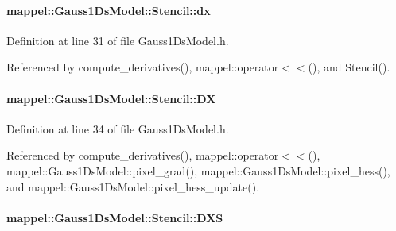 \paragraph[{\texorpdfstring{dx}{dx}}]{ mappel\+::\+Gauss1\+Ds\+Model\+::\+Stencil\+::dx}\hypertarget{classmappel_1_1Gauss1DsModel_1_1Stencil_a89a81cafd54335711f4ae04c0bd8fb26}{}\label{classmappel_1_1Gauss1DsModel_1_1Stencil_a89a81cafd54335711f4ae04c0bd8fb26}


Definition at line 31 of file Gauss1\+Ds\+Model.\+h.



Referenced by compute\+\_\+derivatives(), mappel\+::operator$<$$<$(), and Stencil().

\paragraph[{\texorpdfstring{DX}{DX}}]{ mappel\+::\+Gauss1\+Ds\+Model\+::\+Stencil\+::\+DX}\hypertarget{classmappel_1_1Gauss1DsModel_1_1Stencil_a6f39d486d37c774ac2509a403a19520e}{}\label{classmappel_1_1Gauss1DsModel_1_1Stencil_a6f39d486d37c774ac2509a403a19520e}


Definition at line 34 of file Gauss1\+Ds\+Model.\+h.



Referenced by compute\+\_\+derivatives(), mappel\+::operator$<$$<$(), mappel\+::\+Gauss1\+Ds\+Model\+::pixel\+\_\+grad(), mappel\+::\+Gauss1\+Ds\+Model\+::pixel\+\_\+hess(), and mappel\+::\+Gauss1\+Ds\+Model\+::pixel\+\_\+hess\+\_\+update().

\paragraph[{\texorpdfstring{D\+XS}{DXS}}]{ mappel\+::\+Gauss1\+Ds\+Model\+::\+Stencil\+::\+D\+XS}\hypertarget{classmappel_1_1Gauss1DsModel_1_1Stencil_a0165665a066559026c1c66f75d825a47}{}\label{classmappel_1_1Gauss1DsModel_1_1Stencil_a0165665a066559026c1c66f75d825a47}


